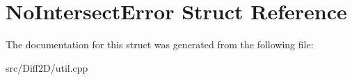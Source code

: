\hypertarget{structNoIntersectError}{
\section{NoIntersectError Struct Reference}
\label{structNoIntersectError}
}


The documentation for this struct was generated from the following file:\begin{DoxyCompactItemize}
\item 
src/Diff2D/util.cpp\end{DoxyCompactItemize}
